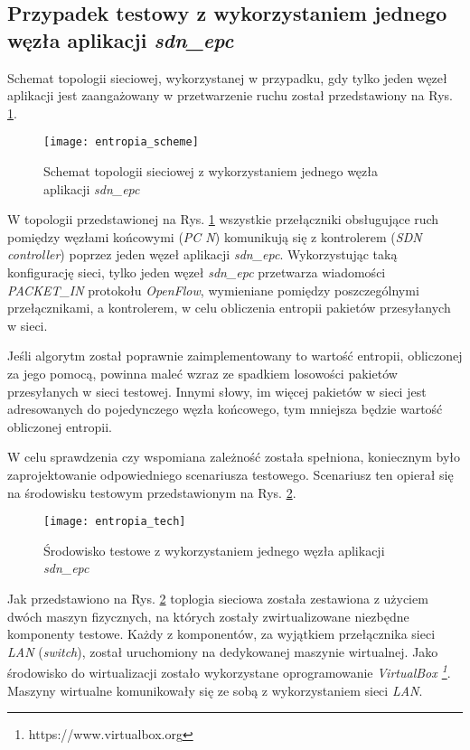\subsection{Przypadek testowy z wykorzystaniem jednego węzła aplikacji
  \textit{sdn\_epc}}

Schemat topologii sieciowej, wykorzystanej w przypadku, gdy tylko jeden węzeł
aplikacji jest zaangażowany w przetwarzenie ruchu został przedstawiony na
Rys. \ref{fig:entropia_scheme}.

\begin{figure}[h]
\centering
\texttt{[image: entropia\_scheme]}
\caption{Schemat topologii sieciowej z wykorzystaniem jednego węzła aplikacji
  \textit{sdn\_epc}}
\label{fig:entropia_scheme}
\end{figure}

W topologii przedstawionej na Rys. \ref{fig:entropia_scheme} wszystkie
przełączniki obsługujące ruch pomiędzy węzłami końcowymi (\textit{PC N})
komunikują się z kontrolerem (\textit{SDN controller}) poprzez jeden węzeł
aplikacji \textit{sdn\_epc}. Wykorzystując taką konfigurację sieci, tylko jeden
węzeł \textit{sdn\_epc} przetwarza wiadomości \mbox{\textit{PACKET\_IN}}
protokołu \textit{OpenFlow}, wymieniane pomiędzy poszczególnymi przełącznikami,
a kontrolerem, w celu obliczenia entropii pakietów przesyłanych w sieci.

Jeśli algorytm został poprawnie zaimplementowany to wartość entropii,
obliczonej za jego pomocą, powinna maleć wzraz ze spadkiem losowości pakietów
przesyłanych w sieci testowej. Innymi słowy, im więcej pakietów w sieci jest
adresowanych do pojedynczego węzła końcowego, tym mniejsza będzie wartość
obliczonej entropii.

W celu sprawdzenia czy wspomiana zależność została spełniona, koniecznym było
zaprojektowanie odpowiedniego scenariusza testowego. Scenariusz ten opierał się
na środowisku testowym przedstawionym na Rys. \ref{fig:entropia_tech}.

\begin{figure}[h]
\centering
\texttt{[image: entropia\_tech]}
\caption{Środowisko testowe z wykorzystaniem jednego węzła aplikacji
  \textit{sdn\_epc}}
\label{fig:entropia_tech}
\end{figure}

Jak przedstawiono na Rys. \ref{fig:entropia_tech} toplogia sieciowa została
zestawiona z użyciem dwóch maszyn fizycznych, na których zostały zwirtualizowane
niezbędne komponenty testowe. Każdy z komponentów, za wyjątkiem przełącznika
sieci \textit{LAN} (\textit{switch}), został uruchomiony na dedykowanej maszynie
wirtualnej. Jako środowisko do wirtualizacji zostało wykorzystane oprogramowanie
\textit{VirtualBox \footnote{https://www.virtualbox.org}}. Maszyny wirtualne
komunikowały się ze sobą z wykorzystaniem sieci \textit{LAN}.

